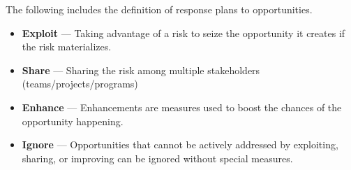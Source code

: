 The following includes the definition of response plans to opportunities.

\begin{itemize}
	\item \textbf{Exploit} ---
	Taking advantage of a risk to seize the opportunity it creates if the risk materializes.

	\item \textbf{Share} ---
	Sharing the risk among multiple stakeholders (teams/projects/programs)

	\item \textbf{Enhance} ---
	Enhancements are measures used to boost the chances of the opportunity happening.

	\item \textbf{Ignore} ---
	Opportunities that cannot be actively addressed by exploiting, sharing, or improving can be ignored without special measures.
\end{itemize}
